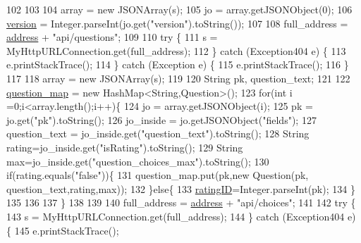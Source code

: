 \begin{DoxyCode}
102             
103 
104         array = \textcolor{keyword}{new} JSONArray(s);
105         jo = array.getJSONObject(0);
106         \hyperlink{classcom_1_1example_1_1qrpoll_1_1_poll_af8617455744b1f5935c9c4042345782c}{version} = Integer.parseInt(jo.get(\textcolor{stringliteral}{"version"}).toString());
107         
108         full\_address = \hyperlink{classcom_1_1example_1_1qrpoll_1_1_poll_a284d664b1db022d0fe8f089c4cad5ead}{address} + \textcolor{stringliteral}{"api/questions"};
109         
110         \textcolor{keywordflow}{try} \{
111             s = MyHttpURLConnection.get(full\_address);
112         \} \textcolor{keywordflow}{catch} (Exception404 e) \{
113             e.printStackTrace();
114         \} \textcolor{keywordflow}{catch} (Exception e) \{
115             e.printStackTrace();
116         \}
117                     
118         array = \textcolor{keyword}{new} JSONArray(s);
119         
120         String pk, question\_text;
121         
122         \hyperlink{classcom_1_1example_1_1qrpoll_1_1_poll_ac4019650bac8ecbf279808dc4d4dae9b}{question\_map} = \textcolor{keyword}{new} HashMap<String,Question>(); 
123         \textcolor{keywordflow}{for}(\textcolor{keywordtype}{int} i =0;i<array.length();i++)\{
124             jo = array.getJSONObject(i);
125             pk = jo.get(\textcolor{stringliteral}{"pk"}).toString(); 
126             jo\_inside = jo.getJSONObject(\textcolor{stringliteral}{"fields"});
127             question\_text = jo\_inside.get(\textcolor{stringliteral}{"question\_text"}).toString();
128             String rating=jo\_inside.get(\textcolor{stringliteral}{"isRating"}).toString();
129             String max=jo\_inside.get(\textcolor{stringliteral}{"question\_choices\_max"}).toString();
130             \textcolor{keywordflow}{if}(rating.equals(\textcolor{stringliteral}{"false"}))\{
131                 question\_map.put(pk,\textcolor{keyword}{new} Question(pk, question\_text,rating,max));
132             \}\textcolor{keywordflow}{else}\{
133                 \hyperlink{classcom_1_1example_1_1qrpoll_1_1_poll_a41aee71def14cf65836f768222a32ba3}{ratingID}=Integer.parseInt(pk);
134             \}
135             
136             
137         \}
138         
139         
140         full\_address = \hyperlink{classcom_1_1example_1_1qrpoll_1_1_poll_a284d664b1db022d0fe8f089c4cad5ead}{address} + \textcolor{stringliteral}{"api/choices"};
141         
142         \textcolor{keywordflow}{try} \{
143             s = MyHttpURLConnection.get(full\_address);
144         \} \textcolor{keywordflow}{catch} (Exception404 e) \{
145             e.printStackTrace();

\end{DoxyCode}
